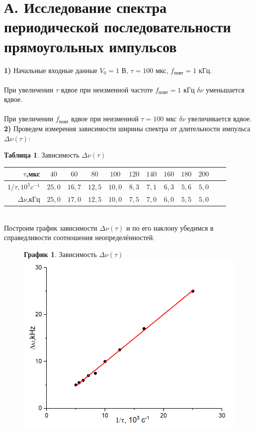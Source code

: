\documentclass[11pt,a4paper]{article}
\begin{document}
\part*{А. Исследование спектра периодической последовательности прямоугольных импульсов}
\textbf{1)} Начальные входные данные $V_0 = 1 $ В, $\tau = 100$ мкс, $f_{\text{повт}} = 1$ кГц.\\\\
При увеличении $\tau$ вдвое при неизменной частоте $f_{\text{повт}} = 1$ кГц $\delta \nu$ уменьшается вдвое. \\\\
При увеличении $f_{\text{повт}}$ вдвое при неизменной $\tau = 100$ мкс $\delta \nu$ увеличивается вдвое.
\newpage
\textbf{2)} Проведем измерения зависимости ширины спектра от длительности импульса $\Delta\nu(\tau)$:\\
\begin{table}[h!]
	\centering
	\textbf{Таблица 1}. Зависимость $\Delta\nu(\tau)$ \\
	\begin{tabular}{|r||c|c|c|c|c|c|c|c|c|c|c|}
		\hline 
		$\tau$,мкс & $40$ & $60$ & $80$ & $100$ & $120$ & $140$ & $160$ & $180$ & $200$ \\ 
		\hline
		$1/\tau,10^3 c^{-1}$ & $25,0$ & $16,7$ & $12,5$ & $10,0$ & $8,3$ & $7,1$ & $6,3$ & $5,6$ & $5,0$ \\ 
		\hline
		$\Delta\nu$,кГц & $25,0$ & $17,0$ & $12,5$ & $10,0$ & $7,5$ & $7,0$ & $6,0$ & $5,5$ & $5,0$ \\ 
		\hline
	\end{tabular}
\end{table}
\\
Построим график зависимости $\Delta\nu(\tau)$ и по его наклону убедимся в справедливости соотношения неопределённостей. \\
\begin{figure} [h!]
	\centering
		\textbf{График 1}. Зависимость $\Delta\nu(\tau)$ \\
	\includegraphics[width=0.7\linewidth]{2}
\end{figure}
\end{document}
